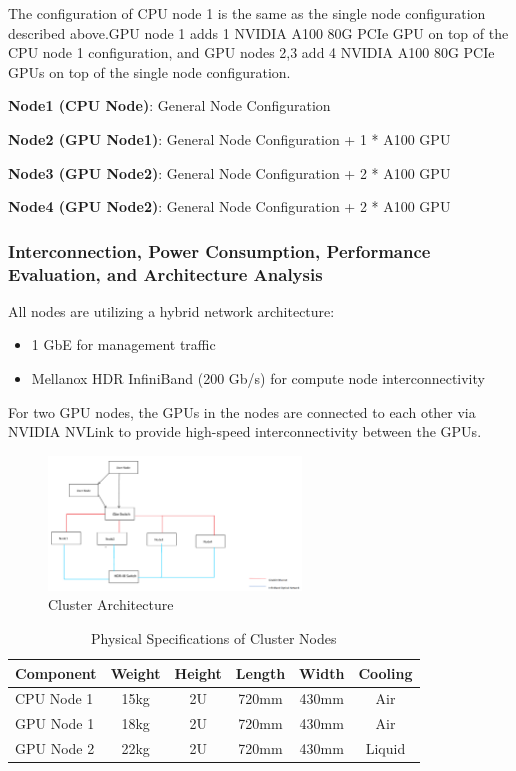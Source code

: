 \documentclass[a4paper,12pt]{article}
\begin{document}
The configuration of CPU node 1 is the same as the single node configuration described above.GPU node 1 adds 1 NVIDIA A100 80G PCIe GPU on top of the CPU node 1 configuration, and GPU nodes 2,3 add 4 NVIDIA A100 80G PCIe GPUs on top of the single node configuration.

\textbf{Node1 (CPU Node)}: General Node Configuration

\textbf{Node2 (GPU Node1)}: General Node Configuration + 1 * A100 GPU

\textbf{Node3 (GPU Node2)}: General Node Configuration + 2 * A100 GPU

\textbf{Node4 (GPU Node2)}: General Node Configuration + 2 * A100 GPU 

\subsubsection{Interconnection, Power Consumption, Performance Evaluation, and Architecture Analysis}

All nodes are utilizing a hybrid network architecture:
\begin{itemize}
    \item 1 GbE for management traffic
    \item Mellanox HDR InfiniBand (200 Gb/s) for compute node interconnectivity
\end{itemize}

For two GPU nodes, the GPUs in the nodes are connected to each other via NVIDIA NVLink to provide high-speed interconnectivity between the GPUs.

\begin{figure}[H]
    \centering
    \includegraphics[width=0.6\textwidth]{Cluster_Architecture.png}
    \caption{Cluster Architecture}
    \label{fig:cluster_arch}
\end{figure}

\begin{table}[H]
\centering
\vspace{0.5cm}
\begin{tabular}{lccccc}  
\toprule
Component & Weight & Height & Length & Width & Cooling \\
\midrule 
CPU Node 1 & 15kg & 2U & 720mm & 430mm & Air \\
GPU Node 1 & 18kg & 2U & 720mm & 430mm & Air \\
GPU Node 2 & 22kg & 2U & 720mm & 430mm & Liquid \\
\bottomrule
\end{tabular}
\caption{Physical Specifications of Cluster Nodes}
\end{table}
\end{document}
